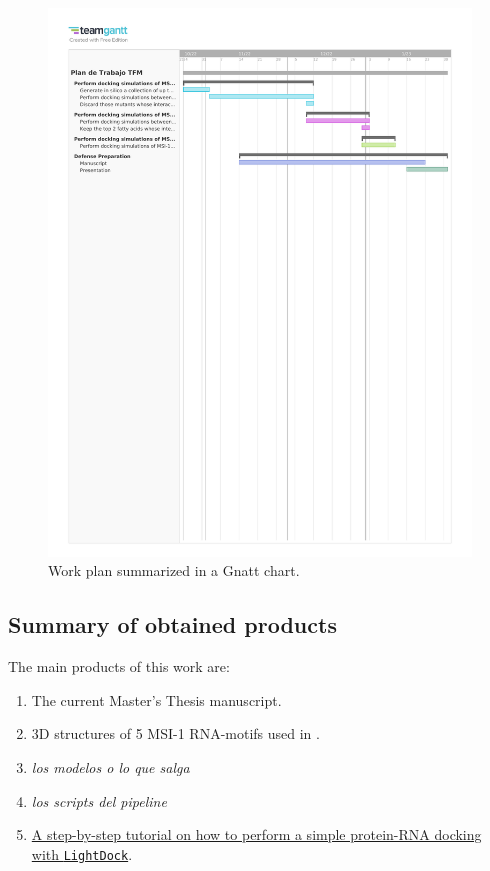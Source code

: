 \begin{figure}[htbp!]
    \centering
    \includegraphics[width=\linewidth, trim={1cm 18.5cm 1cm 2cm},clip]{assets/Plan_de_Trabajo_TFM.pdf}
    \caption{Work plan summarized in a Gnatt chart.}
    \label{fig:gnatt}    
\end{figure}

\subsection{Summary of obtained products}

The main products of this work are:

\begin{enumerate}
    \item The current Master's Thesis manuscript.
    \item 3D structures of 5 MSI-1 RNA-motifs used in \cite{dolcemascolo_2022}.
    \item\textit{los modelos o lo que salga}
    \item\textit{los scripts del pipeline}
    \item\href{https://github.com/lightdock/lightdock.github.io/blob/master/tutorials/0.9.3/rna_docking/index.md}{A step-by-step tutorial on how to perform a simple protein-RNA docking with \texttt{LightDock}}.
\end{enumerate}

